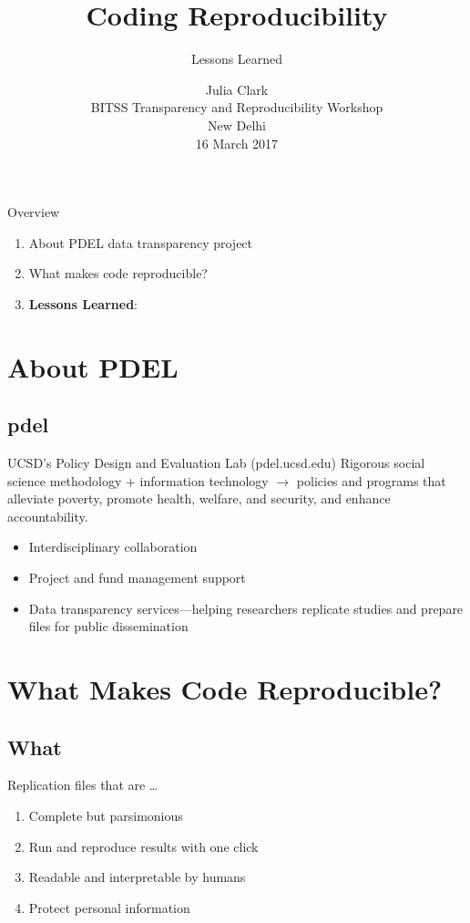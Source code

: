 \documentclass[12pt, compress]{beamer} %
\title[Short Title]{Coding Reproducibility}
\subtitle{Lessons Learned \vspace{-20pt} }
\institute{\vspace{10pt} \texttt{[image: images/pdel.png]}\vspace{10pt} \texttt{[image: images/UCSDlogo]}}
\date[Short Occasion]{Julia Clark \\ BITSS Transparency and Reproducibility Workshop \\ New Delhi \\ 16 March 2017}
\let\olditem\item %
\renewcommand{\item}{%
\olditem\vspace{\fill}}
\begin{document}

{ %
\frame{
  \titlepage
  \note{}
  }
}




	{ %
	\begin{frame}{Overview}
		\begin{enumerate}
			\item About PDEL data transparency project
			\item What makes code reproducible?
			\item \textbf{Lessons Learned}:
		\end{enumerate}
	\end{frame}
	}


\section{About PDEL}
\subsection{pdel}
	\begin{frame}{UCSD's Policy Design and Evaluation Lab (pdel.ucsd.edu)}
		 Rigorous social science methodology \textcolor{ceruleanblue}{+} information technology \textcolor{ceruleanblue}{$\rightarrow$} policies and programs that alleviate poverty, promote health, welfare, and security, and enhance accountability.
		 \begin{itemize}
		 	\item Interdisciplinary collaboration
		 	\item Project and fund management support 
		 	\item \textcolor{burntorange}{Data transparency services---helping researchers replicate studies and prepare files for public dissemination}
		 \end{itemize}
\end{frame}


\section{What Makes Code Reproducible?}

\subsection{What}
	\begin{frame}{Replication files that are \dots}
		\begin{enumerate}
			\item Complete but parsimonious
			\item Run and reproduce results with one click
			\item Readable and interpretable by humans
			\item Protect personal information
		\end{enumerate}
	\end{frame}
\end{document}
